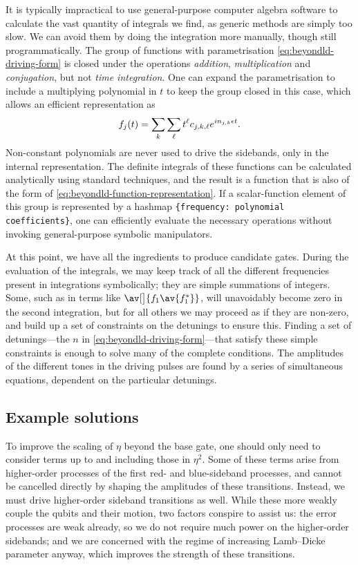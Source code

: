 It is typically impractical to use general-purpose computer algebra software to calculate the vast quantity of integrals we find, as generic methods are simply too slow.
We can avoid them by doing the integration more manually, though still programmatically.
The group of functions with parametrisation \cref{eq:beyondld-driving-form} is closed under the operations \emph{addition}, \emph{multiplication} and \emph{conjugation}, but not \emph{time integration}.
One can expand the parametrisation to include a multiplying polynomial in $t$ to keep the group closed in this case, which allows an efficient representation as
\begin{equation}\label{eq:beyondld-function-representation}
f_j(t) = \sum_k\sum_{\vphantom k\ell} t^\ell c_{j,k,\ell} e^{i n_{j,k} \epsilon t}.
\end{equation}
Non-constant polynomials are never used to drive the sidebands, only in the internal representation.
The definite integrals of these functions can be calculated analytically using standard techniques, and the result is a function that is also of the form of \cref{eq:beyondld-function-representation}.
If a scalar-function element of this group is represented by a hashmap \texttt{\{frequency: polynomial coefficients\}}, one can efficiently evaluate the necessary operations without invoking general-purpose symbolic manipulators.

At this point, we have all the ingredients to produce candidate gates.
During the evaluation of the integrals, we may keep track of all the different frequencies present in integrations symbolically; they are simple summations of integers.
Some, such as in terms like $\av[\big]{f_1\av{f_1^*}}$, will unavoidably become zero in the second integration, but for all others we may proceed as if they are non-zero, and build up a set of constraints on the detunings to ensure this.
Finding a set of detunings---the $n$ in \cref{eq:beyondld-driving-form}---that satisfy these simple constraints is enough to solve many of the complete conditions.
The amplitudes of the different tones in the driving pulses are found by a series of simultaneous equations, dependent on the particular detunings.


\subsection{Example solutions}\label{sec:beyondld-schemes}

To improve the scaling of $\eta$ beyond the base gate, one should only need to consider terms up to and including those in $\eta^2$.
Some of these terms arise from higher-order processes of the first red- and blue-sideband processes, and cannot be cancelled directly by shaping the amplitudes of these transitions.
Instead, we must drive higher-order sideband transitions as well.
While these more weakly couple the qubits and their motion, two factors conspire to assist us: the error processes are weak already, so we do not require much power on the higher-order sidebands; and we are concerned with the regime of increasing Lamb--Dicke parameter anyway, which improves the strength of these transitions.

